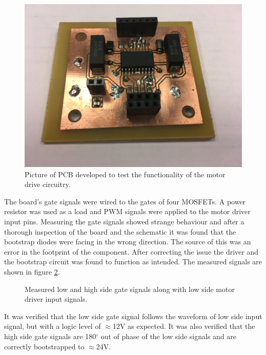 \begin{figure}
	\centering
	\includegraphics[width=0.5\linewidth]{graphics/hipboard_pic}
	\caption[Prototype PCB with motor driver.]{Picture of PCB developed to test the functionality of the motor drive circuitry.}
	\label{fig:m_drive_circuit}
\end{figure}
The board's gate signals were wired to the gates of four MOSFETs.
A power resistor was used as a load and PWM signals were applied to the motor driver input pins. 
Measuring the gate signals showed strange behaviour and after a thorough inspection of the board and the schematic it was found that the bootstrap diodes were facing in the wrong direction. 
The source of this was an error in the footprint of the component. 
After correcting the issue the driver and the bootstrap circuit was found to function as intended. 
The measured signals are shown in figure \ref{fig:test_hip_signals}.

\begin{figure}[h]
	\centering
	\caption[Measured gate and input signals.]{Measured low and high side gate signals along with low side motor driver input signals.}
	\label{fig:test_hip_signals}
\end{figure}
It was verified that the low side gate signal follows the waveform of low side input signal, but with a logic level of $\approx$12V as expected. 
It was also verified that the high side gate signals are 180$^\circ$ out of phase of the low side signals and are correctly bootstrapped to $\approx$24V.

